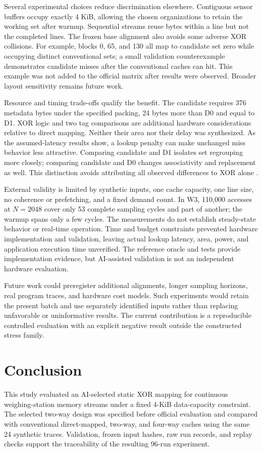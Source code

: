 \documentclass[11pt,a4paper]{article}
\begin{document}
Several experimental choices reduce discrimination elsewhere. Contiguous sensor buffers occupy exactly 4 KiB, allowing the chosen organizations to retain the working set after warmup. Sequential streams reuse bytes within a line but not the completed lines. The frozen base alignment also avoids some adverse XOR collisions. For example, blocks 0, 65, and 130 all map to candidate set zero while occupying distinct conventional sets; a small validation counterexample demonstrates candidate misses after the conventional caches can hit. This example was not added to the official matrix after results were observed. Broader layout sensitivity remains future work.

Resource and timing trade-offs qualify the benefit. The candidate requires 376 metadata bytes under the specified packing, 24 bytes more than D0 and equal to D1. XOR logic and two tag comparisons are additional hardware considerations relative to direct mapping. Neither their area nor their delay was synthesized. As the assumed-latency results show, a lookup penalty can make unchanged miss behavior less attractive. Comparing candidate and D1 isolates set regrouping more closely; comparing candidate and D0 changes associativity and replacement as well. This distinction avoids attributing all observed differences to XOR alone \cite{bhatla2024,yang2023}.

External validity is limited by synthetic inputs, one cache capacity, one line size, no coherence or prefetching, and a fixed demand count. In W3, 110,000 accesses at $N=2048$ cover only 53 complete sampling cycles and part of another; the warmup spans only a few cycles. The measurements do not establish steady-state behavior or real-time operation. Time and budget constraints prevented hardware implementation and validation, leaving actual lookup latency, area, power, and application execution time unverified. The reference oracle and tests provide implementation evidence, but AI-assisted validation is not an independent hardware evaluation.

Future work could preregister additional alignments, longer sampling horizons, real program traces, and hardware cost models. Such experiments would retain the present batch and use separately identified inputs rather than replacing unfavorable or uninformative results. The current contribution is a reproducible controlled evaluation with an explicit negative result outside the constructed stress family.

\section{Conclusion}
This study evaluated an AI-selected static XOR mapping for continuous weighing-station memory streams under a fixed 4-KiB data-capacity constraint. The selected two-way design was specified before official evaluation and compared with conventional direct-mapped, two-way, and four-way caches using the same 24 synthetic traces. Validation, frozen input hashes, raw run records, and replay checks support the traceability of the resulting 96-run experiment.
\end{document}
